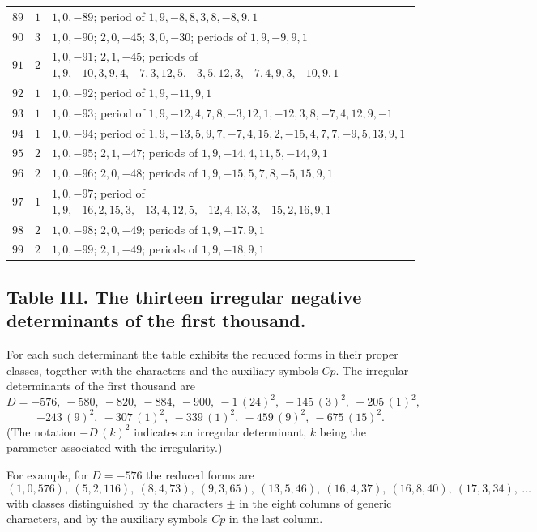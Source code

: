 \documentclass[11pt,a4paper]{article}
\begin{document}
\begin{longtable}{r|r|l}
$89$ & $1$ & $1,0,-89$; period of $1,9,-8,8,3,8,-8,9,1$ \\
$90$ & $3$ & $1,0,-90$; $2,0,-45$; $3,0,-30$; periods of $1,9,-9,9,1$ \\
$91$ & $2$ & $1,0,-91$; $2,1,-45$; periods of $1,9,-10,3,9,4,-7,3,12,5,-3,5,12,3,-7,4,9,3,-10,9,1$ \\
$92$ & $1$ & $1,0,-92$; period of $1,9,-11,9,1$ \\
$93$ & $1$ & $1,0,-93$; period of $1,9,-12,4,7,8,-3,12,1,-12,3,8,-7,4,12,9,-1$ \\
$94$ & $1$ & $1,0,-94$; period of $1,9,-13,5,9,7,-7,4,15,2,-15,4,7,7,-9,5,13,9,1$ \\
$95$ & $2$ & $1,0,-95$; $2,1,-47$; periods of $1,9,-14,4,11,5,-14,9,1$ \\
$96$ & $2$ & $1,0,-96$; $2,0,-48$; periods of $1,9,-15,5,7,8,-5,15,9,1$ \\
$97$ & $1$ & $1,0,-97$; period of $1,9,-16,2,15,3,-13,4,12,5,-12,4,13,3,-15,2,16,9,1$ \\
$98$ & $2$ & $1,0,-98$; $2,0,-49$; periods of $1,9,-17,9,1$ \\
$99$ & $2$ & $1,0,-99$; $2,1,-49$; periods of $1,9,-18,9,1$ \\
\end{longtable}

\subsection*{Table III. The thirteen irregular negative determinants of the first thousand.}

\medskip

\noindent For each such determinant the table exhibits the reduced forms in their proper classes, together with the characters and the auxiliary symbols $Cp$. The irregular determinants of the first thousand are
\[
D=-576,\ -580,\ -820,\ -884,\ -900,\ -1\,(24)^2,\ -145\,(3)^2,\ -205\,(1)^2,
\]
\[
-243\,(9)^2,\ -307\,(1)^2,\ -339\,(1)^2,\ -459\,(9)^2,\ -675\,(15)^2.
\]
(The notation $-D\,(k)^2$ indicates an irregular determinant, $k$ being the parameter associated with the irregularity.)

\medskip

\noindent For example, for $D=-576$ the reduced forms are
\[
(1,0,576),\ (5,2,116),\ (8,4,73),\ (9,3,65),\ (13,5,46),\ (16,4,37),\ (16,8,40),\ (17,3,34),\ \ldots
\]
with classes distinguished by the characters $\pm$ in the eight columns of generic characters, and by the auxiliary symbols $Cp$ in the last column.
\end{document}
